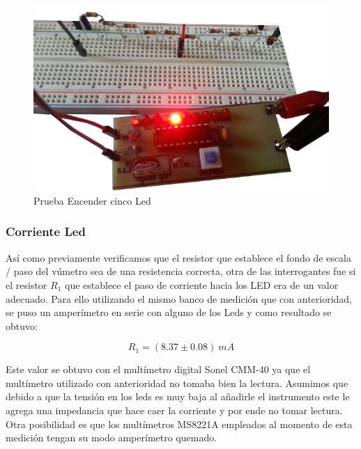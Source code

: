 \documentclass[12pt,a4paper]{article}
\begin{document}
			\begin{figure}[H]
			\centering
				\includegraphics[scale=0.6]{images/res2.png}\caption{Prueba Encender cinco Led}
			\end{figure}

			\subsubsection{Corriente Led}

			Así como previamente verificamos que el resistor que establece el fondo de escala / paso del vúmetro sea de una resistencia correcta, otra de las interrogantes fue si el resistor $R_1$ que establece el paso de corriente hacia los LED era de un valor adecuado. Para ello utilizando el mismo banco de medición que con anterioridad, se puso un amperímetro en serie con alguno de los Leds y como resultado se obtuvo:

			\begin{equation}
				R_1 = (8.37 \pm 0.08) \: mA
			\end{equation}

			Este valor se obtuvo con el multímetro digital Sonel CMM-40 ya que el multímetro utilizado con anterioridad no tomaba bien la lectura. Asumimos que debido a que la tensión en los leds es muy baja al añadirle el instrumento este le agrega una impedancia que hace caer la corriente y por ende no tomar lectura. Otra posibilidad es que los multímetros MS8221A empleados al momento de esta medición tengan su modo amperímetro quemado.
\end{document}
